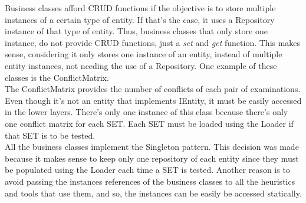 Business classes afford CRUD functions if the objective is to store multiple instances of a certain type of entity. If that's the case, it uses a Repository instance of that type of entity. Thus, business classes that only store one instance, do not provide CRUD functions, just a \textit{set} and \textit{get} function. This makes sense, considering it only stores one instance of an entity, instead of multiple entity instances, not needing the use of a Repository. One example of these classes is the ConflictMatrix. \\

The ConflictMatrix provides the number of conflicts of each pair of examinations. Even though it's not an entity that implements IEntity, it must be easily accessed in the lower layers. There's only one instance of this class because there's only one conflict matrix for each SET. Each SET must be loaded using the Loader if that SET is to be tested.\\

All the business classes implement the Singleton pattern. This decision was made because it makes sense to keep only one repository of each entity since they must be populated using the Loader each time a SET is tested. Another reason is to avoid passing the instances references of the business classes to all the heuristics and tools that use them, and so, the instances can be easily be accessed statically.\\

